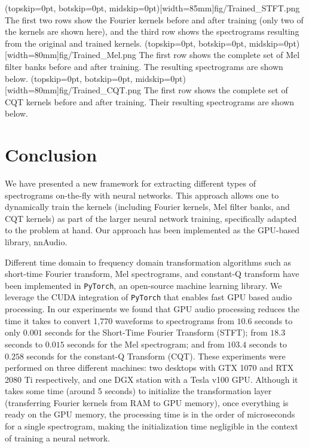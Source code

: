 \documentclass{ieeeaccess}
\newcommand{\nbh}[1]{\texttt{#1}}
\begin{document}
\Figure(topskip=0pt, botskip=0pt, midskip=0pt)[width=85mm]{fig/Trained_STFT.png}
{The first two rows show the Fourier kernels before and after training (only two of the kernels are shown here), and the third row shows the spectrograms resulting from the original and trained kernels.  \label{fig: Trained_STFT}}
\Figure(topskip=0pt, botskip=0pt, midskip=0pt)[width=80mm]{fig/Trained_Mel.png}
{The first row shows the complete set of Mel filter banks before and after training. The resulting spectrograms are shown below.\label{fig: Trained_Mel}}
\Figure(topskip=0pt, botskip=0pt, midskip=0pt)[width=80mm]{fig/Trained_CQT.png}
{The first row shows the complete set of CQT kernels before and after training. Their resulting spectrograms are shown below. \label{fig: Trained_CQT}}


\section{Conclusion}
{We have presented a new framework for extracting different types of spectrograms on-the-fly with neural networks. This approach allows one to dynamically train the kernels (including Fourier kernels, Mel filter banks, and CQT kernels) as part of the larger neural network training, specifically adapted to the problem at hand. Our approach has been implemented as the GPU-based library, nnAudio.} 

Different time domain to frequency domain transformation algorithms such as short-time Fourier transform, Mel spectrograms, and constant-Q transform have been implemented in \nbh{PyTorch}, an open-source machine learning library. We leverage the CUDA integration of \nbh{PyTorch} that enables fast GPU based audio processing. In our experiments we found that GPU audio processing reduces the time it takes to convert 1,770 waveforms to spectrograms from $10.6$ seconds to only $0.001$ seconds for the Short-Time Fourier Transform (STFT); from $18.3$ seconds to $0.015$ seconds for the Mel spectrogram; and from $103.4$ seconds to $0.258$ seconds for the constant-Q Transform (CQT). These experiments were performed on three different machines: two desktops with GTX 1070 and RTX 2080 Ti respectively, and one DGX station with a Tesla v100 GPU. Although it takes some time (around 5 seconds) to initialize the transformation layer (transferring Fourier kernels from RAM to GPU memory), once everything is ready on the GPU memory, the processing time is in the order of microseconds for a single spectrogram, making the initialization time negligible in the context of training a neural network. 
\end{document}
